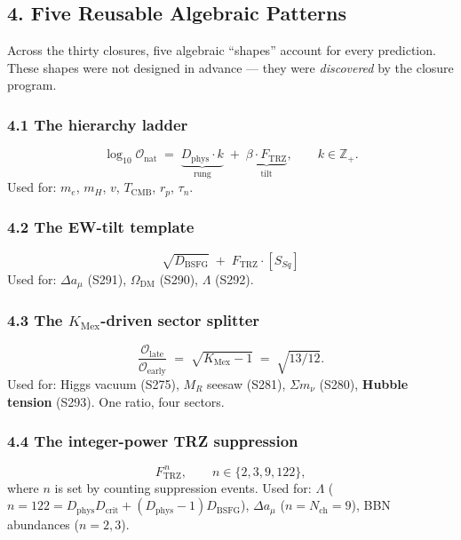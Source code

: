 \documentclass[
]{article}
\begin{document}
\subsection{4. Five Reusable Algebraic
Patterns}\label{five-reusable-algebraic-patterns}

Across the thirty closures, five algebraic ``shapes'' account for every
prediction. These shapes were not designed in advance --- they were
\emph{discovered} by the closure program.

\subsubsection{4.1 The hierarchy ladder}\label{the-hierarchy-ladder}

\[
\log_{10}\mathcal{O}_{\text{nat}} \;=\; \underbrace{D_{\text{phys}}\cdot k}_{\text{rung}} \;+\; \underbrace{\beta\cdot F_{\text{TRZ}}}_{\text{tilt}}, \qquad k\in\mathbb{Z}_+.
\] Used for: \(m_e\), \(m_H\), \(v\), \(T_{\text{CMB}}\), \(r_p\),
\(\tau_n\).

\subsubsection{4.2 The EW-tilt template}\label{the-ew-tilt-template}

\[
\sqrt{D_{\text{BSFG}}} \;+\; F_{\text{TRZ}}\cdot[S_{Sq}]
\] Used for: \(\Delta a_\mu\) (S291), \(\Omega_{\text{DM}}\) (S290),
\(\Lambda\) (S292).

\subsubsection{\texorpdfstring{4.3 The \(K_{\text{Mex}}\)-driven sector
splitter}{4.3 The K\_\{\textbackslash text\{Mex\}\}-driven sector splitter}}\label{the-k_textmex-driven-sector-splitter}

\[
\frac{\mathcal{O}_{\text{late}}}{\mathcal{O}_{\text{early}}} \;=\; \sqrt{K_{\text{Mex}}-1} \;=\; \sqrt{13/12}.
\] Used for: Higgs vacuum (S275), \(M_R\) seesaw (S281),
\(\Sigma m_\nu\) (S280), \textbf{Hubble tension} (S293). One ratio, four
sectors.

\subsubsection{4.4 The integer-power TRZ
suppression}\label{the-integer-power-trz-suppression}

\[
F_{\text{TRZ}}^{\,n}, \qquad n\in\{2,3,9,122\},
\] where \(n\) is set by counting suppression events. Used for:
\(\Lambda\)
(\(n=122=D_{\text{phys}}D_{\text{crit}}+(D_{\text{phys}}-1)D_{\text{BSFG}}\)),
\(\Delta a_\mu\) (\(n=N_{\text{ch}}=9\)), BBN abundances (\(n=2,3\)).
\end{document}
